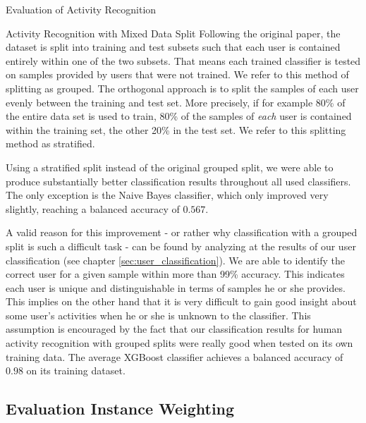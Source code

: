 \begin{section}{Evaluation of Activity Recognition}
	\begin{subsection}{Activity Recognition with Mixed Data Split}\label{subsec:stratified}
		Following the original paper, the dataset is split into training and test subsets such that each user is contained entirely within one of the two subsets. That means each trained classifier is tested on samples provided by users that were not trained. We refer to this method of splitting as \glqq grouped\grqq{}. The orthogonal approach is to split the samples of each user evenly between the training and test set. More precisely, if for example 80\% of the entire data set is used to train, 80\% of the samples of \emph{each} user is contained within the training set, the other 20\% in the test set. We refer to this splitting method as \glqq stratified\grqq{}. \par
		Using a stratified split instead of the original grouped split, we were able to produce substantially better classification results throughout all used classifiers. The only exception is the Naive Bayes classifier, which only improved very slightly, reaching a balanced accuracy of $0.567$. \par
		A valid reason for this improvement - or rather why classification with a grouped split is such a difficult task - can be found by analyzing at the results of our user classification (see chapter \ref{sec:user_classification}). We are able to identify the correct user for a given sample within more than 99\% accuracy. This indicates each user is unique and distinguishable in terms of samples he or she provides. This implies on the other hand that it is very difficult to gain good insight about some user's activities when he or she is unknown to the classifier. This assumption is encouraged by the fact that our classification results for human activity recognition with grouped splits were really good when tested on its own training data. The average XGBoost classifier achieves a balanced accuracy of $0.98$ on its training dataset. 
	\end{subsection}
	
	\subsection{Evaluation Instance Weighting} \label{sec:instance_weighting}
	

\end{section}
